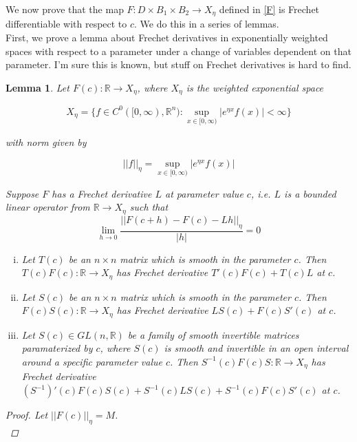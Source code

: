 \documentclass[12pt]{article}
\def\R{{\mathbb R}}
\newtheorem{lemma}{Lemma}
\begin{document}
We now prove that the map $F: D \times B_1 \times B_2 \rightarrow X_\eta$ defined in \eqref{F} is Frechet differentiable with respect to $c$. We do this in a series of lemmas.\\

First, we prove a lemma about Frechet derivatives in exponentially weighted spaces with respect to a parameter under a change of variables dependent on that parameter. I'm sure this is known, but stuff on Frechet derivatives is hard to find.\\

\begin{lemma}\label{frechetfun}
Let $F(c): \R \rightarrow X_\eta$, where $X_\eta$ is the weighted exponential space

\[
X_\eta = \{ f \in C^0([0, \infty), \R^n) : \sup_{x \in [0, \infty)} |e^{\eta x} f(x)| < \infty \}
\]

with norm given by

\[
||f||_\eta = \sup_{x \in [0, \infty)} |e^{\eta x} f(x)|
\]

Suppose $F$ has a Frechet derivative $L$ at parameter value $c$, i.e. $L$ is a bounded linear operator from $\R \rightarrow X_\eta$ such that 
\[
\lim_{h \rightarrow 0} \frac{|| F(c+h) - F(c) - Lh ||_\eta }{|h|} = 0
\]

\begin{enumerate}[(i)]

\item Let $T(c)$ be an $n \times n$ matrix which is smooth in the parameter $c$. Then $T(c)F(c): \R \rightarrow X_\eta$ has Frechet derivative $T'(c)F(c) + T(c)L$ at $c$.

\item Let $S(c)$ be an $n \times n$ matrix which is smooth in the parameter $c$. Then $F(c)S(c): \R \rightarrow X_\eta$ has Frechet derivative $L S(c) + F(c)S'(c)$ at $c$.

\item Let $S(c) \in GL(n, \R)$ be a family of smooth invertible matrices paramaterized by $c$, where $S(c)$ is smooth and invertible in an open interval around a specific parameter value $c$. Then $S^{-1}(c)F(c)S: \R \rightarrow X_\eta$ has Frechet derivative $(S^{-1})'(c) F(c) S(c) + S^{-1}(c) L S (c) + S^{-1}(c) F(c) S'(c)$ at $c$.

\end{enumerate}

\begin{proof}

Let $||F(c)||_\eta = M$.\\


\end{proof}
\end{lemma}
\end{document}
